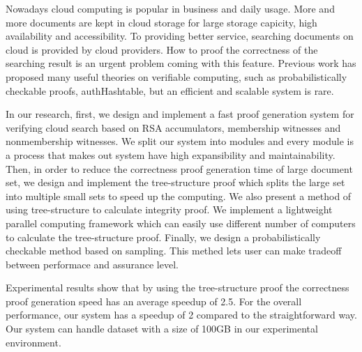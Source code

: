 \begin{englishabstract}

	Nowadays cloud computing is popular in business and daily usage. 
	More and more documents are kept in cloud storage for large storage capicity, high availability and accessibility. 
	To providing better service, searching documents on cloud is provided by cloud providers.
	How to proof the correctness of the searching result is an urgent problem coming with this feature.
	Previous work has proposed many useful theories on verifiable computing, such as probabilistically checkable proofs, authHashtable, but an efficient and scalable system is rare.

	In our research, first, we design and implement a fast proof generation system for verifying cloud search based on RSA accumulators, membership witnesses and nonmembership witnesses. We split our system into modules and every module is a process that makes out system have high expansibility and maintainability. 
	Then, in order to reduce the correctness proof generation time of large document set, we design and implement the tree-structure proof which splits the large set into multiple small sets to speed up the computing. We also present a method of using tree-structure to calculate integrity proof.
	We implement a lightweight parallel computing framework which can easily use different number of computers to calculate the tree-structure proof.
	Finally, we design a probabilistically checkable method based on sampling. This methed lets user can make tradeoff between performace and assurance level.

    Experimental results show that by using the tree-structure proof the correctness proof generation speed has an average speedup of 2.5. For the overall performance, our system has a speedup of 2 compared to the straightforward way. Our system can handle dataset with a size of 100GB in our experimental environment.

\end{englishabstract}
